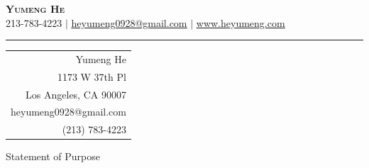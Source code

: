 \documentclass[letterpaper,11pt]{article}
\begin{document}

\begin{center}
    \textbf{\Huge \scshape Yumeng He} \\ \vspace{1pt}
    \small 213-783-4223 $|$ \href{mailto:heyumeng@usc.edu}{\underline{heyumeng0928@gmail.com}} $|$ 
    \href{https://www.heyumeng.com} 
    {\underline{www.heyumeng.com}}
\end{center}


\rule{\linewidth}{0.7pt}


\null\hfill
\begin{tabular}{r @{}}
	Yumeng He \\
	1173 W 37th Pl \\ %
	Los Angeles, CA 90007 \\
  heyumeng0928@gmail.com \\
	(213) 783-4223

\end{tabular}



\bigskip %

Statement of Purpose

\bigskip %
\end{document}
